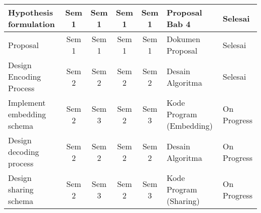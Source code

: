 \documentclass{ittelkom}
\newcommand{\blue}{\cellcolor{blue!75}}
\begin{document}
\begin{table}[h]
\begin{tabular}{|l|c|c|c|c|l|l|}
        Hypothesis formulation                                                  & Sem 1                                                 & Sem 1                                                    & Sem 1                                                                       & Sem 1                                                                     & Proposal Bab 4                                & Selesai                                       \\ \hline
        \rowcolor[HTML]{EFEFEF}
        Proposal                                                                & Sem 1                                                 & Sem 1                                                    & Sem 1                                                                       & Sem 1                                                                     & Dokumen Proposal                              & Selesai                                       \\ \hline
        Design Encoding Process                                                 & Sem 2                                                 & Sem 2                                                    & Sem 2                                                                       & Sem 2                                                                     & Desain Algoritma                              & Selesai                                       \\ \hline
        \rowcolor[HTML]{EFEFEF}
        Implement embedding schema                                              & Sem 2                                                 & Sem 3                                                    & Sem 2                                                                       & \blue Sem 3                                                               & Kode Program (Embedding)                      & \blue On Progress                             \\ \hline
        Design decoding process                                                 & Sem 2                                                 & Sem 2                                                    & Sem 2                                                                       & \blue Sem 2                                                               & Desain Algoritma                              & \blue On Progress                             \\ \hline
        \rowcolor[HTML]{EFEFEF}
        Design sharing schema                                                   & Sem 2                                                 & Sem 3                                                    & Sem 2                                                                       & \blue Sem 3                                                               & Kode Program (Sharing)                        & \blue On Progress                             \\ \hline

\end{tabular}
\end{table}
\end{document}
